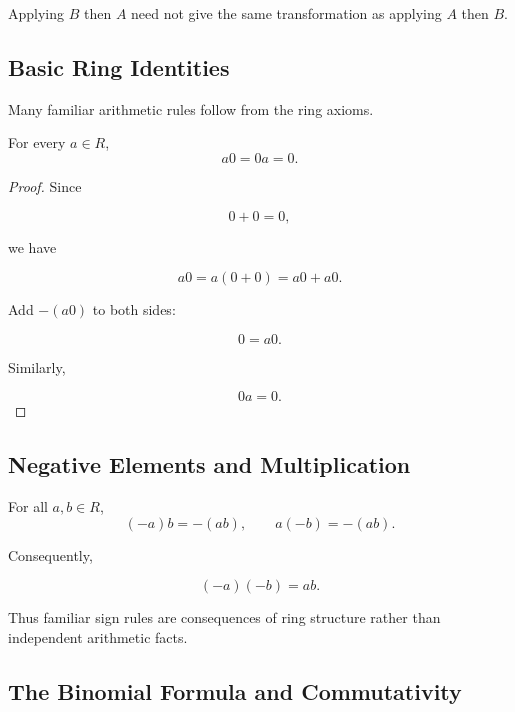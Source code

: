 Applying \(B\) then \(A\) need not give the same transformation as applying
\(A\) then \(B\).

\subsection{Basic Ring Identities}
\label{subsec:basic-ring-identities}

Many familiar arithmetic rules follow from the ring axioms.

\begin{theorem}
For every \(a\in R\),
\[ a0=0a=0. \]
\end{theorem}

\begin{proof}
Since

\[ 0+0=0, \]

we have

\[ a0=a(0+0)=a0+a0. \]

Add \(-(a0)\) to both sides:

\[ 0=a0. \]

Similarly,

\[ 0a=0. \]
\end{proof}

\subsection{Negative Elements and Multiplication}
\label{subsec:ring-negative-elements}

\begin{theorem}
For all \(a,b\in R\),
\[ (-a)b=-(ab),\qquad a(-b)=-(ab). \]
\end{theorem}

Consequently,

\[ (-a)(-b)=ab. \]

Thus familiar sign rules are consequences of ring structure rather than
independent arithmetic facts.

\subsection{The Binomial Formula and Commutativity}
\label{subsec:ring-binomial-formula}

